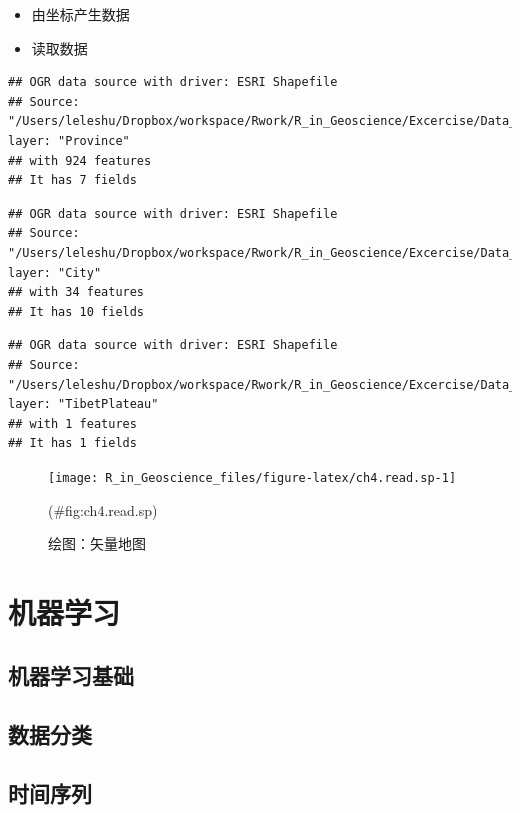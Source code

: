 \documentclass[]{scrbook}
\begin{document}
\begin{itemize}
\item
  由坐标产生数据
\item
  读取数据
\end{itemize}

\begin{verbatim}
## OGR data source with driver: ESRI Shapefile 
## Source: "/Users/leleshu/Dropbox/workspace/Rwork/R_in_Geoscience/Excercise/Data_spatial/Province.shp", layer: "Province"
## with 924 features
## It has 7 fields
\end{verbatim}

\begin{verbatim}
## OGR data source with driver: ESRI Shapefile 
## Source: "/Users/leleshu/Dropbox/workspace/Rwork/R_in_Geoscience/Excercise/Data_spatial/City.shp", layer: "City"
## with 34 features
## It has 10 fields
\end{verbatim}

\begin{verbatim}
## OGR data source with driver: ESRI Shapefile 
## Source: "/Users/leleshu/Dropbox/workspace/Rwork/R_in_Geoscience/Excercise/Data_spatial/TibetPlateau.shp", layer: "TibetPlateau"
## with 1 features
## It has 1 fields
\end{verbatim}

\begin{figure}

{\centering \texttt{[image: R\_in\_Geoscience\_files/figure-latex/ch4.read.sp-1]} 

}

\caption{绘图：矢量地图}(\#fig:ch4.read.sp)
\end{figure}

\hypertarget{ai}{%
\chapter{机器学习}\label{ai}}

\hypertarget{ux673aux5668ux5b66ux4e60ux57faux7840}{%
\section{机器学习基础}\label{ux673aux5668ux5b66ux4e60ux57faux7840}}

\hypertarget{ux6570ux636eux5206ux7c7b}{%
\section{数据分类}\label{ux6570ux636eux5206ux7c7b}}

\hypertarget{ux65f6ux95f4ux5e8fux5217}{%
\section{时间序列}\label{ux65f6ux95f4ux5e8fux5217}}


\end{document}
